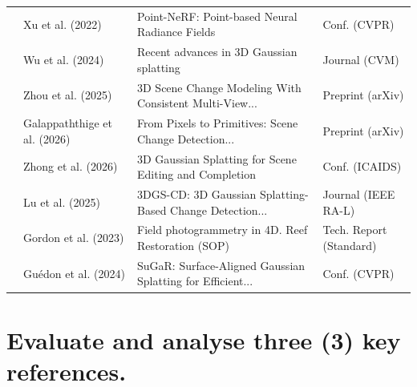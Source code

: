 \documentclass[12pt, a4paper]{article}
\begin{document}
\begin{table}[h]
\begin{tabularx}{\textwidth}{|l|l|X|l|}
\cite{9880452} & Xu et al. (2022) & Point-NeRF: Point-based Neural Radiance Fields & Conf. (CVPR) \\
\cite{10897713} & Wu et al. (2024) & Recent advances in 3D Gaussian splatting & Journal (CVM) \\
\cite{zhou20253dscenechangemodeling} & Zhou et al. (2025) & 3D Scene Change Modeling With Consistent Multi-View... & Preprint (arXiv) \\
\cite{galappaththige2026pixelsprimitivesscenechange} & Galappaththige et al. (2026) & From Pixels to Primitives: Scene Change Detection... & Preprint (arXiv) \\
\cite{10.1145/3806262.3806264} & Zhong et al. (2026) & 3D Gaussian Splatting for Scene Editing and Completion & Conf. (ICAIDS) \\
\cite{10852207} & Lu et al. (2025) & 3DGS-CD: 3D Gaussian Splatting-Based Change Detection... & Journal (IEEE RA-L) \\
\cite{gordon2023field} & Gordon et al. (2023) & Field photogrammetry in 4D. Reef Restoration (SOP) & Tech. Report (Standard)\\
\cite{guedon2024sugar} & Guédon et al. (2024) & SuGaR: Surface-Aligned Gaussian Splatting for Efficient... & Conf. (CVPR) \\
\hline
\end{tabularx}
\end{table}




\section*{Evaluate and analyse three (3) key references.}
\end{document}
